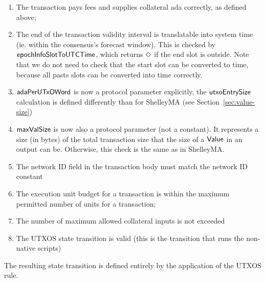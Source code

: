 \begin{enumerate}
  \item The transaction pays fees and supplies collateral ada correctly, as defined above;

  \item The end of the transaction validity interval is translatable into
  system time (ie. within the consensus's forecast window). This is checked
  by $\mathsf{epochInfoSlotToUTCTime}$, which returns $\Diamond$ if the end slot is outside.
  Note that we do not need to check that the start slot can be converted to
  time, because all pasts slots can be converted into time correctly.

  \item $\mathsf{adaPerUTxOWord}$ is now a protocol parameter explicitly, the
  $\mathsf{utxoEntrySize}$ calculation is defined differently than for ShelleyMA
  (see Section~\ref{sec:value-size})

  \item $\mathsf{maxValSize}$ is now also a protocol parameter (not a constant).
  It represents a size (in bytes) of the total transaction
  size that the size of a $\mathsf{Value}$ in an output can be. Otherwise, this check is
  the same as in ShelleyMA.

  \item The network ID field in the transaction body must match the
  network ID constant

 \item The execution unit budget for a transaction is within the maximum
  permitted number of units for a transaction;

  \item The number of maximum allowed collateral inputs is not exceeded

  \item The UTXOS state transition is valid (this is the transition that runs the
  non-native scripts)
\end{enumerate}

The resulting state transition is defined entirely by the application of the
UTXOS rule.

